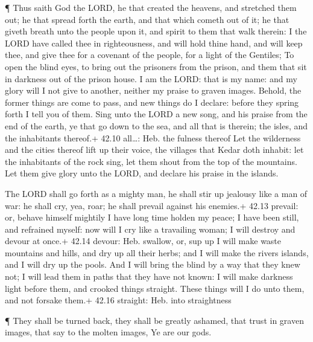  ¶ Thus saith God the LORD, he that created the heavens, and
stretched them out; he that spread forth the earth, and that which
cometh out of it; he that giveth breath unto the people upon it, and
spirit to them that walk therein:  I the LORD have called
thee in righteousness, and will hold thine hand, and will keep thee, and
give thee for a covenant of the people, for a light of the Gentiles;
 To open the blind eyes, to bring out the prisoners from the
prison, and them that sit in darkness out of the prison house.
 I am the LORD: that is my name: and my glory will I not
give to another, neither my praise to graven images. 
Behold, the former things are come to pass, and new things do I declare:
before they spring forth I tell you of them.  Sing unto the
LORD a new song, and his praise from the end of the earth, ye that go
down to the sea, and all that is therein; the isles, and the inhabitants
thereof.+ 42.10 all\ldots: Heb. the fulness thereof  Let
the wilderness and the cities thereof lift up their voice, the villages
that Kedar doth inhabit: let the inhabitants of the rock sing, let them
shout from the top of the mountains.  Let them give glory
unto the LORD, and declare his praise in the islands.

 The LORD shall go forth as a mighty man, he shall stir up
jealousy like a man of war: he shall cry, yea, roar; he shall prevail
against his enemies.+ 42.13 prevail: or, behave himself mightily
 I have long time holden my peace; I have been still, and
refrained myself: now will I cry like a travailing woman; I will destroy
and devour at once.+ 42.14 devour: Heb. swallow, or, sup up
 I will make waste mountains and hills, and dry up all
their herbs; and I will make the rivers islands, and I will dry up the
pools.  And I will bring the blind by a way that they knew
not; I will lead them in paths that they have not known: I will make
darkness light before them, and crooked things straight. These things
will I do unto them, and not forsake them.+ 42.16 straight: Heb. into
straightness

 ¶ They shall be turned back, they shall be greatly
ashamed, that trust in graven images, that say to the molten images, Ye
are our gods.

